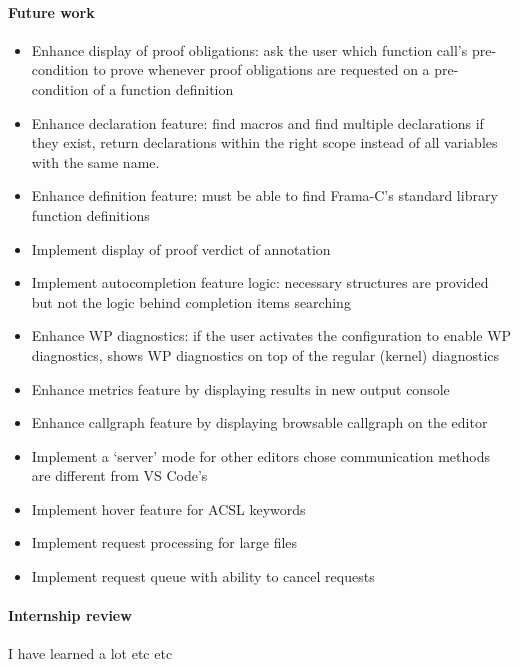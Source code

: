 \documentclass[10pt]{article}
\begin{document}
\begin{singlespace}
\paragraph*{Future work}
\begin{itemize}
	\item[--] Enhance display of proof obligations: ask the user which function call's pre-condition to prove whenever proof obligations are requested on a pre-condition of a function definition
	\item[--] Enhance declaration feature: find macros and find multiple declarations if they exist, return declarations within the right scope instead of all variables with the same name.
	\item[--] Enhance definition feature: must be able to find Frama-C's standard library function definitions
	\item[--] Implement display of proof verdict of annotation
	\item[--] Implement autocompletion feature logic: necessary structures are provided but not the logic behind completion items searching
	\item[--] Enhance WP diagnostics: if the user activates the configuration to enable WP diagnostics, shows WP diagnostics on top of the regular (kernel) diagnostics
	\item[--] Enhance metrics feature by displaying results in new output console
	\item[--] Enhance callgraph feature by displaying browsable callgraph on the editor
	\item[--] Implement a `server' mode for other editors chose communication methods are different from VS Code's
	\item[--] Implement hover feature for ACSL keywords

	\item[--] Implement request processing for large files
	\item[--] Implement request queue with ability to cancel requests 
\end{itemize}

\paragraph*{Internship review}
I have learned a lot etc etc

\appendix 
\printbibliography[heading=bibintoc]

\end{singlespace}
\end{document}
